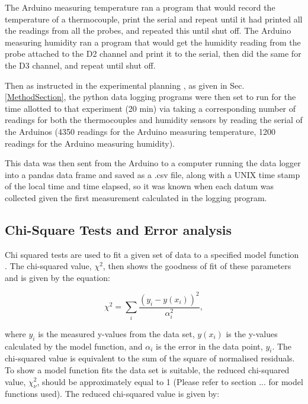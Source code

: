 \documentclass{article}
\begin{document}
The Arduino  measuring temperature ran a program that would record the temperature of a thermocouple, print  the serial and repeat until it had printed all the readings from all the probes, and repeated this until shut off.
The Arduino measuring humidity ran a program that would get the humidity reading from the probe attached to the D2 channel and print it to the serial, then did the same for the D3 channel, and repeat until shut off. 


\vspace{3mm}

Then as instructed in the experimental planning , as given in Sec. \ref{MethodSection}, the python data logging programs were then set to run for the time allotted to that experiment (20 min) via taking a corresponding number of readings for both the thermocouples and humidity sensors by reading the serial of the Arduinos (4350  readings for the Arduino measuring temperature, 1200 readings for the Arduino measuring humidity).

\vspace{3mm}

This data was then sent from the Arduino to a computer running the data logger into a pandas data frame and saved as a .csv file, along with a UNIX time stamp of the local time and time elapsed, so it was known when each datum was collected given the first measurement calculated in the logging program. 

\subsection{Chi-Square Tests and Error analysis}

Chi squared tests are used to fit a given set of data to a specified model function \cite{LS2}. The chi-squared value, $\chi^{2}$, then shows the goodness of fit of these parameters and is given by the equation:

\begin{equation}\label{ChiEqn}
\chi^{2} = \sum_{i}\frac{(y_{i}-y(x_{i}))^{2}}{\alpha_{i}^{2}},
\end{equation}

where  $y_{i}$ is the measured y-values from the data set, $y(x_{i})$ is the y-values calculated by the model function, and $\alpha_{i}$ is the error in the data point, $y_{i}$. The chi-squared value is equivalent to the sum of the square of normalised residuals. To show a model function fits the data set is suitable, the reduced chi-squared value, $\chi_{\nu}^{2}$, should be approximately equal to 1 (Please refer to section ... for model functions used). The reduced chi-squared value is given by:
\end{document}
